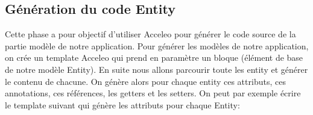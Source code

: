 \subsection{Génération du code Entity}
Cette phase a pour objectif d'utiliser Acceleo pour générer le code source de la partie modèle de notre application.
Pour générer les modèles de notre application, on crée un template Acceleo qui prend en paramètre un bloque (élément de base de notre modèle Entity). En suite nous allons parcourir toute les entity et générer le contenu de chacune. On génère alors pour chaque entity ces attributs, ces annotations, ces références, les getters et les setters. On peut par exemple écrire le template suivant qui génère les attributs pour chaque Entity: \\
\clearpage



